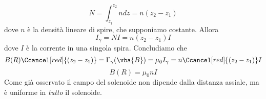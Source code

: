\begin{examplewt}
	\begin{equation*}
		N=\int_{z_1}^{z_2}ndz=n\left(z_2-z_1\right)
	\end{equation*}
	dove $n$ è la densità lineare di spire, che supponiamo costante. Allora
	\begin{equation*}
		I_{\gamma}=N I = n\left(z_2-z_1\right) I
	\end{equation*}
	dove $I$ è la corrente in una singola spira. Concludiamo che
	\begin{equation*}
		B(R)\Ccancel[red]{(z_2-z_1)}=\Gamma_{\gamma}(\vba{B})=\mu_0I_\gamma=n\Ccancel[red]{(z_2-z_1)} I
	\end{equation*}
	\begin{equation}
		B(R)=\mu_0 n I
	\end{equation}
	Come già osservato il campo del solenoide non dipende dalla distanza assiale, ma è uniforme in \textit{tutto} il solenoide. 
\end{examplewt}

